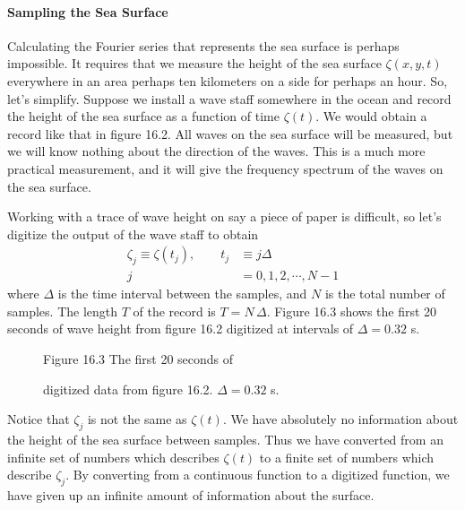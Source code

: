 \paragraph{Sampling the Sea Surface}
Calculating the Fourier series that represents the sea surface is perhaps
impossible. It requires that we measure the height of the sea surface
$\zeta (x,y,t)$ everywhere in an area perhaps ten kilometers on a side for
perhaps an hour. So, let's simplify. Suppose we install a wave staff somewhere
in the ocean and record the height of the sea surface as a function of time
$\zeta (t)$. We would obtain a record like that in figure 16.2. All waves on
the sea surface will be measured, but we will know nothing about the direction
of the waves. This is a much more practical measurement, and it will give the
frequency spectrum of the waves on the sea surface.

Working with a trace of wave height on say a piece of paper is difficult, so
let's digitize the output of the wave staff to obtain
\begin{align}
  \zeta _{j} \equiv \zeta (t_{j}), \qquad  t_{j} &\equiv j \Delta  \\
  j &= 0, 1, 2, \cdots , N-1 \nonumber
\end{align}
where $\Delta $ is the time interval between the samples, and $N$ is
the total number of samples. The length $T$ of the record is $T = N \, \Delta
$. Figure 16.3 shows the first 20 seconds of wave height from figure 16.2
digitized at intervals of $\Delta = 0.32$ s.

\begin{figure}[t!]
\centering
{}
\footnotesize
Figure 16.3 The first 20 seconds of \rule{0mm}{3ex}digitized data from figure 16.2.
$\Delta = 0.32$ s.

\label{fi2:wavepts}
\vspace{-3ex}
\end{figure}

Notice that $\zeta _{j}$ is not the same as $\zeta (t)$. We have absolutely no
information about the height of the sea surface between samples. Thus we have
converted from an infinite set of numbers which describes $\zeta (t)$ to a
finite set of numbers which describe $\zeta _{j}$. By converting from a
continuous function to a digitized function, we have given up an infinite
amount of information about the surface.

